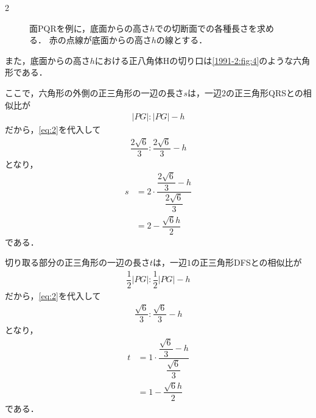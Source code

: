 \documentclass[../../main.tex]{subfiles}
\begin{document}
\begin{multicols}{2}
\begin{figure}[H]
    \caption{面PQRを例に，底面からの高さ$h$での切断面での各種長さを求める．
    赤の点線が底面からの高さ$h$の線とする．}
    \label{1991-2:fig:5}
  \end{figure}

  また，底面からの高さ$h$における正八角体Hの切り口は\cref{1991-2:fig:4}のような六角形である．

  ここで，六角形の外側の正三角形の一辺の長さ$s$は，一辺$2$の正三角形QRSとの相似比が
  \begin{align}
    |PG|:|PG|-h
  \end{align}
  だから，\cref{eq:2}を代入して
  \begin{align}
    \dfrac{2\sqrt{6}}{3} : \dfrac{2\sqrt{6}}{3} -h
  \end{align}
  となり，
  \begin{align}
    s
    & = 2\cdot \dfrac{\dfrac{2\sqrt{6}}{3} -h}{\dfrac{2\sqrt{6}}{3}} \\
    & = 2 - \dfrac{\sqrt{6}h}{2}
  \end{align}
  である．

  切り取る部分の正三角形の一辺の長さ$t$は，一辺$1$の正三角形DFSとの相似比が
  \begin{align}
    \dfrac{1}{2}|PG| : \dfrac{1}{2}|PG| - h
  \end{align}
  だから，\cref{eq:2}を代入して
  \begin{align}
    \dfrac{\sqrt{6}}{3} : \dfrac{\sqrt{6}}{3} -h
  \end{align}
  となり，
  \begin{align}
    t
    & = 1\cdot \dfrac{\dfrac{\sqrt{6}}{3} -h}{\dfrac{\sqrt{6}}{3}} \\
    & = 1 - \dfrac{\sqrt{6}h}{2}
  \end{align}
  である．


\end{multicols}
\end{document}
